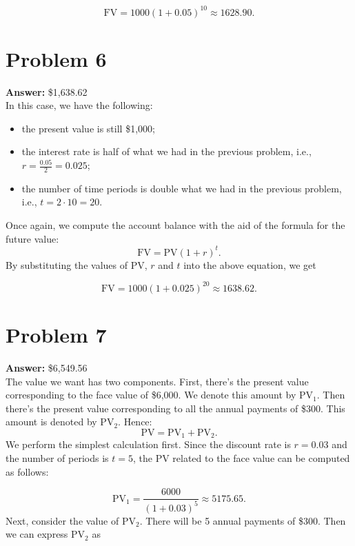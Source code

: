 \documentclass[11pt]{article}
\newcommand{\pv}{\mathrm{PV}}
\newcommand{\fv}{\mathrm{FV}}
\begin{document}
\begin{equation}
\fv=1000(1+0.05)^{10}\approx 1628.90.
\end{equation}
\section*{Problem 6}
\label{sec:org281acae}

\textbf{Answer:} \$1,638.62\\

In this case, we have the following:
\begin{itemize}
\item the present value is still \$1,000;
\item the interest rate is half of what we had in the previous problem, i.e.,
\(r=\frac{0.05}{2}=0.025\);
\item the number of time periods is double what we had in the previous problem,
i.e., \(t=2\cdot 10=20\).
\end{itemize}
Once again, we compute the account balance with the aid of the formula for the
future value:
\begin{equation}
\fv=\pv(1+r)^t.
\end{equation}
By substituting the values of \(\pv\), \(r\) and \(t\) into the above
equation, we get

\begin{equation}
\fv=1000(1+0.025)^{20}\approx 1638.62.
\end{equation}
\section*{Problem 7}
\label{sec:orge0c7860}

\textbf{Answer:} \$6,549.56\\

The value we want has two components. First, there's the present value
corresponding to the face value of \$6,000. We denote this amount by \(\pv_1\).
Then there's the present value corresponding to all the annual payments of \$300.
This amount is denoted by \(\pv_2\). Hence:
\begin{equation}
\pv=\pv_1+\pv_2.
\end{equation}
We perform the simplest calculation first. Since the discount rate is \(r=0.03\)
and the number of periods is \(t=5\), the PV related to the face value can be
computed as follows:

\begin{equation}
\pv_1=\frac{6000}{(1+0.03)^5}\approx 5175.65.
\end{equation}
Next, consider the value of \(\pv_2\). There will be 5 annual payments of
\$300. Then we can express \(\pv_2\) as
\end{document}
